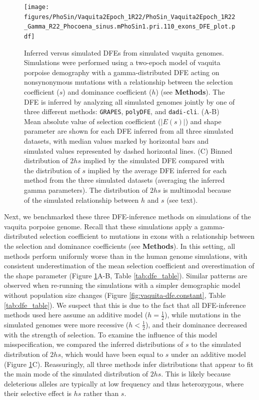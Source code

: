 \documentclass[hidelinks]{article}
\newcommand{\polydfe}{\texttt{polyDFE}\xspace}
\newcommand{\dadicli}{\texttt{dadi-cli}\xspace}
\newcommand{\grapes}{\texttt{GRAPES}\xspace}
\begin{document}
    \begin{figure}[b!]
        \centering
        \texttt{[image: figures/PhoSin/Vaquita2Epoch\_1R22/PhoSin\_Vaquita2Epoch\_1R22\_Gamma\_R22\_Phocoena\_sinus.mPhoSin1.pri.110\_exons\_DFE\_plot.pdf]}
        \caption{
        \label{fig:vaquita-dfe}
        Inferred versus simulated DFEs from simulated vaquita genomes.
        Simulations were performed using a two-epoch model of vaquita porpoise demography with a gamma-distributed DFE
        acting on nonsynonymous mutations with a relationship between the selection coefficient ($s$) and dominance coefficient ($h$) (see \textbf{Methods}).
        The DFE is inferred by analyzing all simulated genomes jointly by one of three different methods:
        \grapes, \polydfe, and \dadicli.
        (A-B) Mean absolute value of selection coefficient ($\lvert E(s) \rvert $) and shape parameter are
        shown for each DFE inferred from all three simulated datasets,
        with median values marked by horizontal bars
        and simulated values represented by dashed horizontal lines.
        (C) Binned distribution of $2hs$ implied by the simulated DFE compared with
        the distribution of $s$ implied by the average DFE inferred for each method from the three simulated datasets (averaging the inferred gamma parameters).
        The distribution of $2 h s$ is multimodal because of the simulated relationship between $h$ and $s$ (see text).
        }
    \end{figure}

    Next, we benchmarked these three DFE-inference methods on simulations of the vaquita porpoise genome.
    Recall that these simulations apply a gamma-distributed selection coefficient to mutations in exons
    with a relationship between the selection and dominance coefficients (see \textbf{Methods}).
    In this setting, all methods perform uniformly worse than in the human genome simulations,
    with consistent underestimation of the mean selection coefficient
    and overestimation of the shape parameter (Figure \ref{fig:vaquita-dfe}A-B, Table \ref{tab:dfe_table}).
    Similar patterns are observed when re-running the simulations with a simpler demographic model
    without population size changes (Figure \ref{fig:vaquita-dfe.constant}, Table \ref{tab:dfe_table}).
    We suspect that this is due to the fact that all DFE-inference methods used here assume an additive model ($h = \frac{1}{2}$),
    while mutations in the simulated genomes were more recessive ($h < \frac{1}{2}$), and their dominance decreased with the strength of selection.
    To examine the influence of this model misspecification, we compared the inferred distributions of $s$ to the
    simulated distribution of $2hs$, which would have been equal to $s$ under an additive model (Figure \ref{fig:vaquita-dfe}C).
    Reassuringly, all three methods infer distributions that appear to fit the main mode of the simulated distribution of $2hs$.
    This is likely because deleterious alleles are typically at low frequency and thus heterozygous,
    where their selective effect is $h s$ rather than $s$.
\end{document}
